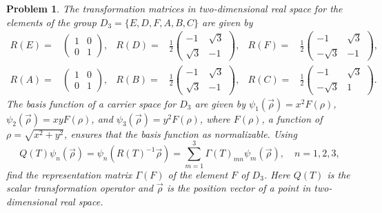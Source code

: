 \documentclass[UTF8,10pt,a4paper]{article}
\theoremstyle{Problem}
\newtheorem{prob}{Problem}
\theoremstyle{Solution}
\begin{document}
\begin{prob}
    The transformation matrices in two-dimensional real space for the elements of the group $D_3=\{E,D,F,A,B,C\}$ are given by
    \begin{align*}
        R(E)=&\left(\begin{matrix}
            1&0\\
            0&1
        \end{matrix}\right),&R(D)=&\frac{1}{2}\left(\begin{matrix}
            -1&\sqrt{3}\\
            \sqrt{3}&-1
        \end{matrix}\right),&R(F)=&\frac{1}{2}\left(\begin{matrix}
            -1&\sqrt{3}\\
            -\sqrt{3}&-1
        \end{matrix}\right),\\
        R(A)=&\left(\begin{matrix}
            1&0\\
            0&1
        \end{matrix}\right),&R(B)=&\frac{1}{2}\left(\begin{matrix}
            -1&\sqrt{3}\\
            \sqrt{3}&-1
        \end{matrix}\right),&R(C)=&\frac{1}{2}\left(\begin{matrix}
            -1&\sqrt{3}\\
            -\sqrt{3}&1
        \end{matrix}\right).
    \end{align*}
    The basis function of a carrier space for $D_3$ are given by $\psi_1(\vec{\rho})=x^2F(\rho)$, $\psi_2(\vec{\rho})=xyF(\rho)$, and $\psi_3(\vec{\rho})=y^2F(\rho)$, where $F(\rho)$, a function of $\rho=\sqrt{x^2+y^2}$, ensures that the basis function as normalizable. Using
    \[
        Q(T)\psi_n(\vec{\rho})=\psi_n(R(T)^{-1}\vec{\rho})=\sum_{m=1}^3\Gamma(T)_{mn}\psi_m(\vec{\rho}),\quad n=1,2,3,
    \]
    find the representation matrix $\Gamma(F)$ of the element $F$ of $D_3$. Here $Q(T)$ is the scalar transformation operator and $\vec{\rho}$ is the position vector of a point in two-dimensional real space.
\end{prob}
\end{document}
